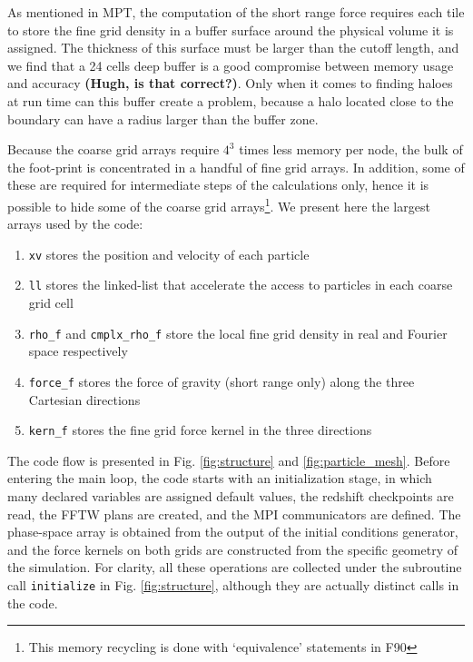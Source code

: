 As mentioned in MPT, the computation of the short range force requires each tile to store the fine grid density in a buffer surface around the physical volume it is assigned. The thickness of this surface must be larger than the cutoff length, and we find that a 24 cells deep buffer
is a good compromise between memory usage and accuracy {\bf (Hugh, is that correct?)}.
Only when it comes to finding haloes at run time can this buffer create a problem, because a halo located close to the boundary
can have a radius larger than the buffer zone. 
 


Because the coarse grid arrays require $4^3$ times less memory per node, 
the bulk of the foot-print is concentrated in a handful of fine grid arrays.
In addition, some of these are required for intermediate steps of the calculations only, 
hence it is possible to hide some of the coarse grid arrays\footnote{ This memory recycling is done with `equivalence' statements in {\small F90}}.   
We present here the largest arrays used by the code:
\begin{enumerate}
\item{{\tt xv} stores the position and velocity of each particle} 
\item{{\tt ll} stores the linked-list that accelerate the access to particles in each coarse grid cell}
\item{{\tt rho\_f} and {\tt cmplx\_rho\_f} store 
the local fine grid density  in real and Fourier space respectively}
\item{{\tt force\_f} stores the force of gravity (short range only) along the three Cartesian directions}
\item{{\tt kern\_f} stores the fine grid force kernel in the three directions}
\end{enumerate}


The code flow is presented in Fig. \ref{fig:structure} and \ref{fig:particle_mesh}.
Before entering the main loop, the code starts with an initialization stage, 
in which many declared variables are assigned default values,
the redshift checkpoints are read, the {\small FFTW} plans are created, and the {\small MPI} communicators are defined.
The phase-space array  is obtained from the output of the initial conditions generator,
and the force kernels on both grids are constructed from the specific geometry of the simulation.
For clarity, all these operations are collected under the subroutine call {\tt initialize} in Fig. \ref{fig:structure}, 
although they are actually distinct calls in the code.

